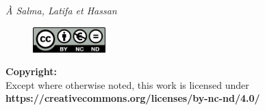 \vfill
\begin{flushright}
    \vfill
	\hfill
	\emph{À Salma, Latifa et Hassan}
	\vfill
\end{flushright}
\mbox{}
\vfill
\begin{figure}
    \begin{center}
        \vspace{-\baselineskip}
        \includegraphics[width=0.25\textwidth]{figures/thesis-copyright.png}
    \end{center}
\end{figure}
\noindent
\textbf{Copyright:}\\
Except where otherwise noted,
this work is licensed under\\
\textbf{https://creativecommons.org/licenses/by-nc-nd/4.0/}
